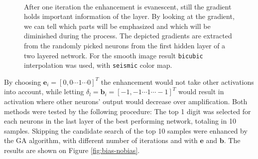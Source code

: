 
\begin{figure}
    \centering
    \\
    \vfill
    \caption{After one iteration the enhancement is evanescent, still the gradient holds important information of the layer.
    By looking at the gradient, we can tell which parts will be emphasized and which will be diminished during the process.
    The depicted gradients are extracted from the randomly picked neurons from the first hidden layer of a two layered network.
    For the smooth image result \texttt{bicubic} interpolation was used, with \texttt{seismic} color map.
    }
    \label{fig:grad-sub}
\end{figure}

By choosing $\mathbf{e}_{i} = [0, 0 \cdots 1 \cdots 0]^T$ the enhancement would not take other activations into account, while letting $\delta_l = \mathbf{b}_i = [-1, -1 \cdots 1 \cdots -1]^T$ would result in activation where other neurons' output would decrease over amplification. 
Both methods were tested by the following procedure: The top 1 digit was selected for each neurons in the last layer of the best performing network, totaling in 10 samples. Skipping the candidate search of the top 10 samples were enhanced by the GA algorithm, with different number of iterations and with $\mathbf{e}$ and $ \mathbf{b}$. The results are shown on Figure \ref{fig:bias-nobias}. 

